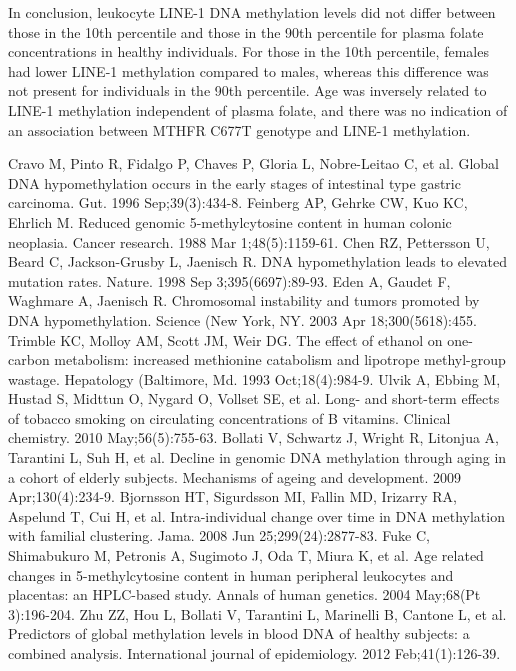 	In conclusion, leukocyte LINE-1 DNA methylation levels did not differ between those in the 10th percentile and those in the 90th percentile for plasma folate concentrations in healthy individuals. For those in the 10th percentile, females had lower LINE-1 methylation compared to males, whereas this difference was not present for individuals in the 90th percentile. Age was inversely related to LINE-1 methylation independent of plasma folate, and there was no indication of an association between MTHFR C677T genotype and LINE-1 methylation. 
 
\begin{thebibliography}{12} 
		Cravo M, Pinto R, Fidalgo P, Chaves P, Gloria L, Nobre-Leitao C, et al. Global DNA hypomethylation occurs in the early stages of intestinal type gastric carcinoma. Gut. 1996 Sep;39(3):434-8. 
		Feinberg AP, Gehrke CW, Kuo KC, Ehrlich M. Reduced genomic 5-methylcytosine content in human colonic neoplasia. Cancer research. 1988 Mar 1;48(5):1159-61. 
		Chen RZ, Pettersson U, Beard C, Jackson-Grusby L, Jaenisch R. DNA hypomethylation leads to elevated mutation rates. Nature. 1998 Sep 3;395(6697):89-93. 
		Eden A, Gaudet F, Waghmare A, Jaenisch R. Chromosomal instability and tumors promoted by DNA hypomethylation. Science (New York, NY. 2003 Apr 18;300(5618):455. 
		Trimble KC, Molloy AM, Scott JM, Weir DG. The effect of ethanol on one-carbon metabolism: increased methionine catabolism and lipotrope methyl-group wastage. Hepatology (Baltimore, Md. 1993 Oct;18(4):984-9. 
		Ulvik A, Ebbing M, Hustad S, Midttun O, Nygard O, Vollset SE, et al. Long- and short-term effects of tobacco smoking on circulating concentrations of B vitamins. Clinical chemistry. 2010 May;56(5):755-63. 
		Bollati V, Schwartz J, Wright R, Litonjua A, Tarantini L, Suh H, et al. Decline in genomic DNA methylation through aging in a cohort of elderly subjects. Mechanisms of ageing and development. 2009 Apr;130(4):234-9. 
		Bjornsson HT, Sigurdsson MI, Fallin MD, Irizarry RA, Aspelund T, Cui H, et al. Intra-individual change over time in DNA methylation with familial clustering. Jama. 2008 Jun 25;299(24):2877-83. 
		Fuke C, Shimabukuro M, Petronis A, Sugimoto J, Oda T, Miura K, et al. Age related changes in 5-methylcytosine content in human peripheral leukocytes and placentas: an HPLC-based study. Annals of human genetics. 2004 May;68(Pt 3):196-204. 
		Zhu ZZ, Hou L, Bollati V, Tarantini L, Marinelli B, Cantone L, et al. Predictors of global methylation levels in blood DNA of healthy subjects: a combined analysis. International journal of epidemiology. 2012 Feb;41(1):126-39. 

\end{thebibliography}
